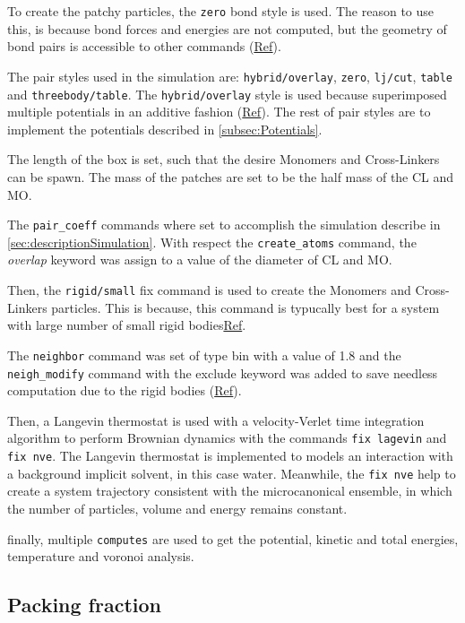 \documentclass[main.tex]{subfiles}
\begin{document}
To create the patchy particles, the \verb|zero| bond style is used.
The reason to use this, is because bond forces and energies are not computed, but the geometry of bond pairs is accessible to other commands (\href{https://docs.lammps.org/bond_zero.html}{Ref}).

The pair styles used in the simulation are: \verb|hybrid/overlay|, \verb|zero|, \verb|lj/cut|, \verb|table| and \verb|threebody/table|.
The \verb|hybrid/overlay| style is used because superimposed multiple potentials in an additive fashion (\href{https://docs.lammps.org/pair_hybrid.html}{Ref}).
The rest of pair styles are to implement the potentials described in \ref{subsec:Potentials}.

The length of the box is set, such that the desire Monomers and Cross-Linkers can be spawn.
The mass of the patches are set to be the half mass of the CL and MO.

The \verb|pair_coeff| commands where set to accomplish the simulation describe in \ref{sec:descriptionSimulation}.
With respect the \verb|create_atoms| command, the \textit{overlap} keyword was assign to a value of the diameter of CL and MO.

Then, the \verb|rigid/small| fix command is used to create the Monomers and Cross-Linkers particles.
This is because, this command is typucally best for a system with large number of small rigid bodies\href{https://docs.lammps.org/fix_rigid.html}{Ref}.

The \verb|neighbor| command was set of type bin with a value of 1.8 and the \verb|neigh_modify| command with the exclude keyword was added to save needless computation due to the rigid bodies (\href{https://docs.lammps.org/neigh_modify.html}{Ref}).

Then, a Langevin thermostat is used with a velocity-Verlet time integration algorithm to perform Brownian dynamics with the commands \verb|fix lagevin| and \verb|fix nve|.
The Langevin thermostat is implemented to models an interaction with a background implicit solvent, in this case water.
Meanwhile, the \verb|fix nve| help to create a system trajectory consistent with the microcanonical ensemble, in which the number of particles, volume and energy remains constant.

finally, multiple \verb|computes| are used to get the potential, kinetic and total energies, temperature and voronoi analysis.

\subsection{Packing fraction}
\end{document}
